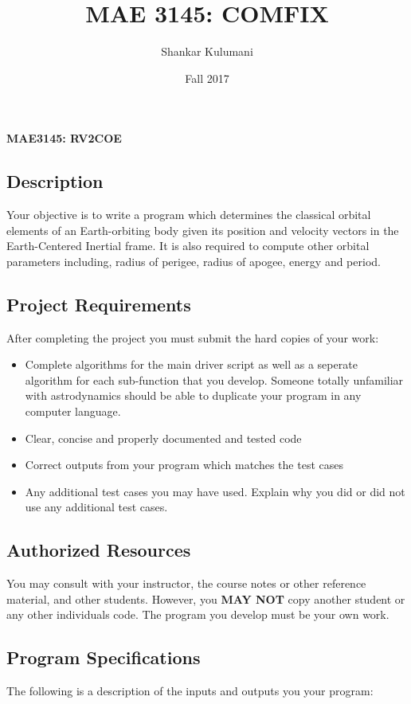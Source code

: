 \documentclass[11pt, reqno]{article}    %
\title{MAE 3145: COMFIX}
\author{Shankar Kulumani}
\date{Fall 2017}                          %
\begin{document}
\begin{center}
{\Large \textbf{MAE3145: RV2COE}}
\end{center}
\subsection*{Description}

Your objective is to write a program which determines the classical orbital elements of an Earth-orbiting body given its position and velocity vectors in the Earth-Centered Inertial frame.
It is also required to compute other orbital parameters including, radius of perigee, radius of apogee, energy and period.

\subsection*{Project Requirements}
After completing the project you must submit the hard copies of your work:
\begin{itemize}
    \item Complete algorithms for the main driver script as well as a seperate algorithm for each sub-function that you develop.
        Someone totally unfamiliar with astrodynamics should be able to duplicate your program in any computer language.
    \item Clear, concise and properly documented and tested code
    \item Correct outputs from your program which matches the test cases
    \item Any additional test cases you may have used. 
        Explain why you did or did not use any additional test cases.
\end{itemize}

\subsection*{Authorized Resources}
You may consult with your instructor, the course notes or other reference material, and other students. 
However, you \textbf{MAY NOT} copy another student or any other individuals code. 
The program you develop must be your own work.

\subsection*{Program Specifications}
The following is a description of the inputs and outputs you your program:
\end{document}
